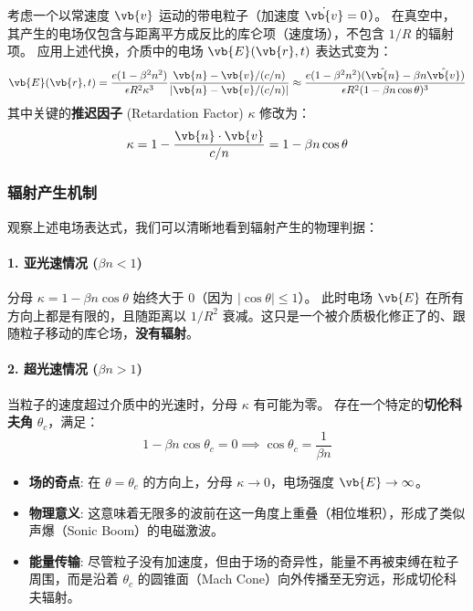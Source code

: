 考虑一个以常速度 $\vb{v}$ 运动的带电粒子（加速度 $\dot{\vb{v}} = 0$）。
在真空中，其产生的电场仅包含与距离平方成反比的库仑项（速度场），不包含 $1/R$ 的辐射项。
应用上述代换，介质中的电场 $\vb{E}(\vb{r}, t)$ 表达式变为：
\begin{equation}
    \vb{E}(\vb{r}, t) = \frac{e (1 - \beta^2 n^2)}{ \epsilon R^2 \kappa^3 } \frac{\vb{n} - \vb{v}/(c/n)}{|\vb{n} - \vb{v}/(c/n)|}
    \approx \frac{e (1 - \beta^2 n^2) (\hat{\vb{n}} - \beta n \hat{\vb{v}})}{\epsilon R^2 (1 - \beta n \cos\theta)^3}
\end{equation}
其中关键的\textbf{推迟因子} (Retardation Factor) $\kappa$ 修改为：
\begin{equation}
    \kappa = 1 - \frac{\vb{n} \cdot \vb{v}}{c/n} = 1 - \beta n \cos\theta
\end{equation}

\subsubsection{辐射产生机制}

观察上述电场表达式，我们可以清晰地看到辐射产生的物理判据：

\paragraph{1. 亚光速情况 ($\beta n < 1$)}
分母 $\kappa = 1 - \beta n \cos\theta$ 始终大于 0（因为 $|\cos\theta| \le 1$）。
此时电场 $\vb{E}$ 在所有方向上都是有限的，且随距离以 $1/R^2$ 衰减。这只是一个被介质极化修正了的、跟随粒子移动的库仑场，\textbf{没有辐射}。

\paragraph{2. 超光速情况 ($\beta n > 1$)}
当粒子的速度超过介质中的光速时，分母 $\kappa$ 有可能为零。
存在一个特定的\textbf{切伦科夫角} $\theta_c$，满足：
\begin{equation}
    1 - \beta n \cos\theta_c = 0 \implies \cos\theta_c = \frac{1}{\beta n}
\end{equation}
\begin{itemize}
    \item \textbf{场的奇点}: 在 $\theta = \theta_c$ 的方向上，分母 $\kappa \to 0$，电场强度 $\vb{E} \to \infty$。
    \item \textbf{物理意义}: 这意味着无限多的波前在这一角度上重叠（相位堆积），形成了类似声爆（Sonic Boom）的电磁激波。
    \item \textbf{能量传输}: 尽管粒子没有加速度，但由于场的奇异性，能量不再被束缚在粒子周围，而是沿着 $\theta_c$ 的圆锥面（Mach Cone）向外传播至无穷远，形成切伦科夫辐射。
\end{itemize}


